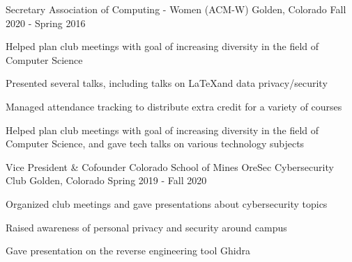 \vspace{-2.0mm}

\begin{cventries}


\cventry
  {Secretary}
  {Association of Computing - Women (ACM-W)}
  {Golden, Colorado}
  {Fall 2020 - Spring 2016}
  {
    \begin{cvitems}
      \ifcv
      \item {Helped plan club meetings with goal of increasing diversity in the field of Computer Science}
      \item {Presented several talks, including talks on \LaTeX and data privacy/security} %
      \item {Managed attendance tracking to distribute extra credit for a variety of courses}
      \else
      \item {Helped plan club meetings with goal of increasing diversity in the field of Computer Science, and gave tech talks on various technology subjects} %
      \fi
    \end{cvitems}
  }
  {}

  \ifcv

  \cventry
    {Vice President \& Cofounder} %
    {Colorado School of Mines OreSec Cybersecurity Club} %
    {Golden, Colorado} %
    {Spring 2019 - Fall 2020} %
    {
      \begin{cvitems} %
        \item {Organized club meetings and gave presentations about
            cybersecurity topics}
          \ifcv
        \item {Raised awareness of personal privacy and security around campus}
        \item {Gave presentation on the reverse engineering tool Ghidra}
        \fi
      \end{cvitems}
    }
    {}


\end{cventries}
